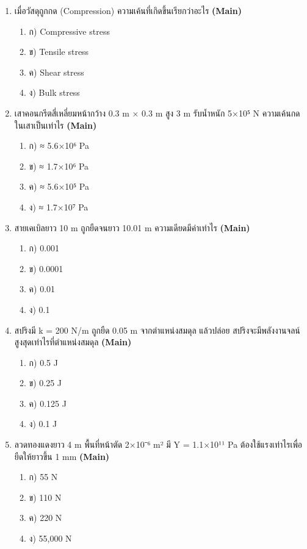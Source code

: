 \documentclass[12pt]{article}
\begin{document}
\begin{enumerate}[label=\arabic*.]
\begin{enumerate}[label=)]
\end{enumerate}
\item เมื่อวัสดุถูกกด (Compression) ความเค้นที่เกิดขึ้นเรียกว่าอะไร \hfill \textbf{\small (Main)}
\begin{enumerate}[label=)]
\item ก) Compressive stress
\item ข) Tensile stress
\item ค) Shear stress
\item ง) Bulk stress
\end{enumerate}
\item เสาคอนกรีตสี่เหลี่ยมหน้ากว้าง 0.3 m × 0.3 m สูง 3 m รับน้ำหนัก 5×10⁵ N ความเค้นกดในเสาเป็นเท่าไร \hfill \textbf{\small (Main)}
\begin{enumerate}[label=)]
\item ก) ≈ 5.6×10⁶ Pa
\item ข) ≈ 1.7×10⁶ Pa
\item ค) ≈ 5.6×10⁵ Pa
\item ง) ≈ 1.7×10⁷ Pa
\end{enumerate}
\item สายเคเบิลยาว 10 m ถูกยืดจนยาว 10.01 m ความเดียดมีค่าเท่าไร \hfill \textbf{\small (Main)}
\begin{enumerate}[label=)]
\item ก) 0.001
\item ข) 0.0001
\item ค) 0.01
\item ง) 0.1
\end{enumerate}
\item สปริงมี k = 200 N/m ถูกยืด 0.05 m จากตำแหน่งสมดุล แล้วปล่อย สปริงจะมีพลังงานจลน์สูงสุดเท่าไรที่ตำแหน่งสมดุล \hfill \textbf{\small (Main)}
\begin{enumerate}[label=)]
\item ก) 0.5 J
\item ข) 0.25 J
\item ค) 0.125 J
\item ง) 0.1 J
\end{enumerate}
\item ลวดทองแดงยาว 4 m พื้นที่หน้าตัด 2×10⁻⁶ m² มี Y = 1.1×10¹¹ Pa ต้องใช้แรงเท่าไรเพื่อยืดให้ยาวขึ้น 1 mm \hfill \textbf{\small (Main)}
\begin{enumerate}[label=)]
\item ก) 55 N
\item ข) 110 N
\item ค) 220 N
\item ง) 55,000 N
\end{enumerate}

\end{enumerate}
\end{document}
